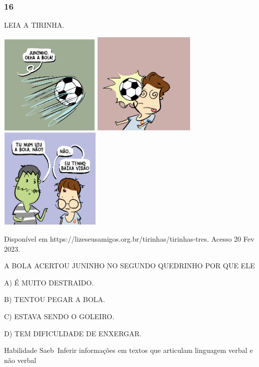 \begin{escola}
\subsubsection{16}\label{section-72}

LEIA A TIRINHA.

\includegraphics[width=1.88542in,height=1.88542in]{media/image236.png}
\includegraphics[width=1.92708in,height=1.92708in]{media/image237.png}
\includegraphics[width=1.90625in,height=1.90625in]{media/image238.png}

Disponível em https://lizeseusamigos.org.br/tirinhas/tirinhas-tres.
Acesso 20 Fev 2023.

A BOLA ACERTOU JUNINHO NO SEGUNDO QUEDRINHO POR QUE ELE

A) É MUITO DESTRAIDO.

B) TENTOU PEGAR A BOLA.

C) ESTAVA SENDO O GOLEIRO.

D) TEM DIFICULDADE DE ENXERGAR.

Habilidade Saeb~Inferir informações em textos que articulam linguagem
verbal e não verbal


\end{escola}
